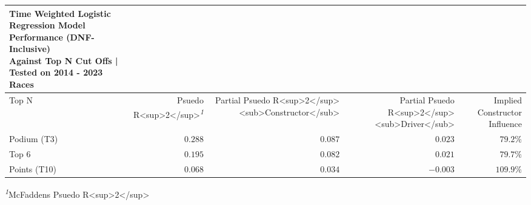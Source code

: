 \setlength{\LTpost}{0mm}
\begin{longtable}{lrrrr}
\caption*{
{\large \textbf{Time Weighted Logistic Regression Model Performance (DNF-Inclusive)}} \\ 
{\small Against Top N Cut Offs | Tested on 2014 - 2023 Races}
} \\ 
\toprule
Top N & Psuedo R<sup>2</sup>\textsuperscript{\textit{1}} & Partial Psuedo R<sup>2</sup><sub>Constructor</sub> & Partial Psuedo R<sup>2</sup><sub>Driver</sub> & Implied Constructor Influence \\ 
\midrule\addlinespace[2.5pt]
Podium (T3) & $0.288$ & $0.087$ & $0.023$ & $79.2\%$ \\ 
Top 6 & $0.195$ & $0.082$ & $0.021$ & $79.7\%$ \\ 
Points (T10) & $0.068$ & $0.034$ & $-0.003$ & $109.9\%$ \\ 
\bottomrule
\end{longtable}
\begin{minipage}{\linewidth}
\textsuperscript{\textit{1}}McFaddens Psuedo R<sup>2</sup>\\
\end{minipage}

